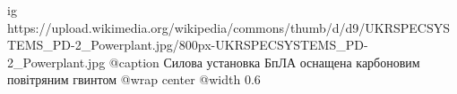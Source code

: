  
 
 
 
 

\ifcmt
  ig https://upload.wikimedia.org/wikipedia/commons/thumb/d/d9/UKRSPECSYSTEMS_PD-2_Powerplant.jpg/800px-UKRSPECSYSTEMS_PD-2_Powerplant.jpg
	@caption Силова установка БпЛА оснащена карбоновим повітряним гвинтом
  @wrap center
  @width 0.6
\fi
